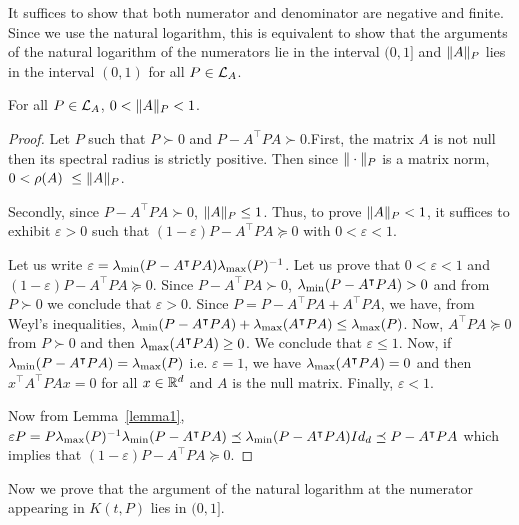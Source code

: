 \documentclass[10pt]{article}
\begin{document}
It suffices to show that both numerator and denominator are negative and finite. Since we use the natural logarithm, this is equivalent to show that the arguments of the natural logarithm of the numerators lie in the interval $(0,1]$ and $\| A\|_P$ lies in the interval $(0,1)$ for all $P\in\mathcal{L}_{A}$. 

\begin{lemma}
For all $P\in\mathcal{L}_{A}$, $0<\| A\|_P<1$. 
\end{lemma}

\begin{proof}
Let $P$ such that $P\succ 0$ and $P-A^\intercal P A\succ 0$.First, the matrix $A$ is not null then its spectral radius is strictly positive. Then since $\| \cdot\|_P$ is a matrix norm, $0<\rho(A) \leq \norm{A}_P$.

Secondly, since $P-A^\intercal P A\succ 0$, $\| A\|_P\leq 1$. Thus, to prove $\| A\|_P<1$, it suffices to exhibit $\varepsilon>0$ such that $(1-\varepsilon) P-A^\intercal P A\succeq 0$ with $0<\varepsilon<1$. 

Let us write $\varepsilon=\lambda_{\operatorname{min}}(P-A^\intercal P A) \lambda_{\operatorname{max}}(P)^{-1}$. Let us prove that $0<\varepsilon<1$ and $(1-\varepsilon) P-A^\intercal P A\succeq 0$.  Since $P-A^\intercal P A\succ 0$, $\lambda_{\operatorname{min}}(P-A^\intercal P A)>0$ and from $P\succ 0$ we conclude that $\varepsilon >0$. Since $P=P-A^ \intercal P A +A^\intercal P A$, we have, from Weyl's inequalities, $\lambda_{\operatorname{min}}(P-A^\intercal P A)+\lambda_{\operatorname{max}}(A^\intercal P A)\leq \lambda_{\operatorname{max}}(P)$. Now, $A^\intercal P A\succeq 0$ from $P\succ 0$ and then $\lambda_{\operatorname{max}}(A^\intercal P A)\geq 0$. We conclude that $\varepsilon\leq 1$. Now, if $\lambda_{\operatorname{min}}(P-A^\intercal P A)=\lambda_{\operatorname{max}}(P)$ i.e. $\varepsilon=1$, we have 
$\lambda_{\operatorname{max}}(A^\intercal P A)=0$ and then $x^\intercal A^\intercal P A x=0$ for all $x\in \mathbb R^d$ and $A$ is the null matrix. 
Finally, $\varepsilon<1$. 

Now from Lemma~\ref{lemma1}, $\varepsilon P=P\lambda_{\operatorname{max}}(P)^{-1}\lambda_{\operatorname{min}}(P-A^\intercal P A)\preceq \lambda_{\operatorname{min}}(P-A^\intercal P A)Id_d\preceq 
P-A^\intercal P A$ which implies that $(1-\varepsilon) P -A^\intercal P A\succeq 0$. 
\end{proof}

Now we prove that the argument of the natural logarithm at the numerator appearing in $K(t,P)$ lies in $(0,1]$. 
\end{document}

